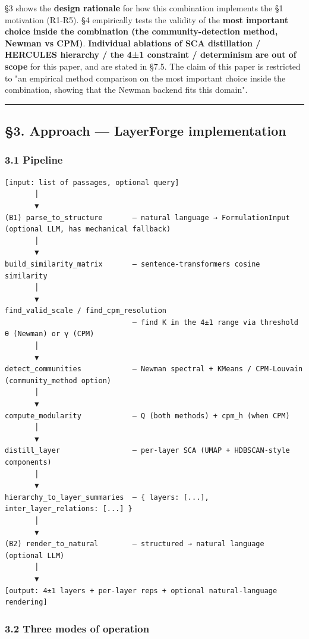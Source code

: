 \documentclass[
]{article}
\begin{document}
§3 shows the \textbf{design rationale} for how this combination
implements the §1 motivation (R1-R5). §4 empirically tests the validity
of the \textbf{most important choice inside the combination (the
community-detection method, Newman vs CPM)}. \textbf{Individual
ablations of SCA distillation / HERCULES hierarchy / the 4±1 constraint
/ determinism are out of scope} for this paper, and are stated in §7.5.
The claim of this paper is restricted to "an empirical method comparison
on the most important choice inside the combination, showing that the
Newman backend fits this domain".

\begin{center}\rule{0.5\linewidth}{0.5pt}\end{center}

\subsection{§3. Approach --- LayerForge
implementation}\label{3-approach--layerforge-implementation}

\subsubsection{3.1 Pipeline}\label{31-pipeline}

\begin{verbatim}
[input: list of passages, optional query]
       │
       ▼
(B1) parse_to_structure       — natural language → FormulationInput (optional LLM, has mechanical fallback)
       │
       ▼
build_similarity_matrix       — sentence-transformers cosine similarity
       │
       ▼
find_valid_scale / find_cpm_resolution
                              — find K in the 4±1 range via threshold θ (Newman) or γ (CPM)
       │
       ▼
detect_communities            — Newman spectral + KMeans / CPM-Louvain (community_method option)
       │
       ▼
compute_modularity            — Q (both methods) + cpm_h (when CPM)
       │
       ▼
distill_layer                 — per-layer SCA (UMAP + HDBSCAN-style components)
       │
       ▼
hierarchy_to_layer_summaries  — { layers: [...], inter_layer_relations: [...] }
       │
       ▼
(B2) render_to_natural        — structured → natural language (optional LLM)
       │
       ▼
[output: 4±1 layers + per-layer reps + optional natural-language rendering]
\end{verbatim}

\subsubsection{3.2 Three modes of
operation}\label{32-three-modes-of-operation}
\end{document}
